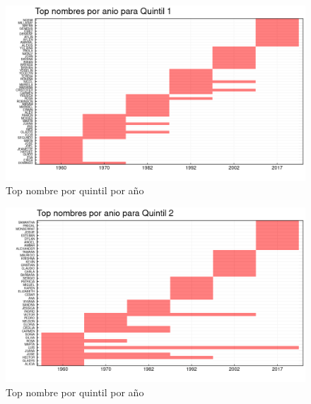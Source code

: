 \begin{landscape}
\begin{figure}[H]
\begin{center}
    \includegraphics[width=22cm]{plot/top_quintil_1.png}
    \caption{Top nombre por quintil por año}
    \label{fig:top_quintil_1}
\end{center}
\end{figure}
\end{landscape}


\begin{landscape}
\begin{figure}[H]
\begin{center}
    \includegraphics[width=22cm]{plot/top_quintil_2.png}
    \caption{Top nombre por quintil por año}
    \label{fig:top_quintil_2}
\end{center}
\end{figure}
\end{landscape}


